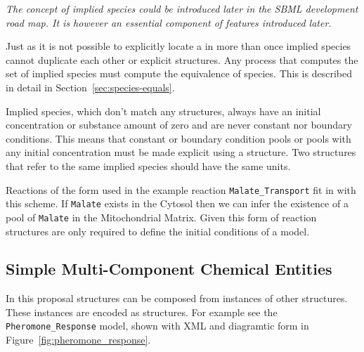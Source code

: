 \documentclass{cekarticle}
\begin{document}
\emph{The concept of implied species could be introduced later in the SBML development road map.
It is however an essential component of features introduced later.}

Just as it is not possible to explicitly locate a  in  more than
once implied species cannot duplicate each other or explicit  structures.
Any process that computes the set of implied species must compute the equivalence of
species.  This is described in detail in Section~\ref{sec:species-equals}.

Implied species, which don't match any  structures, always have an initial
concentration or substance amount of zero and are never
constant nor boundary conditions.  This means that constant or boundary condition pools or pools
with any initial concentration must be made explicit using a  structure.
Two
 structures that refer to the same implied species should have
the same units.

Reactions of the form used in the example reaction \texttt{Malate\_Transport} fit in with this scheme.
If \texttt{Malate} exists in the
Cytosol then we can infer the existence of a pool of \texttt{Malate} in the
Mitochondrial Matrix.  Given this form of reaction  structures are only
required to define the initial conditions of a model.

\subsection{Simple Multi-Component Chemical Entities}
\label{sec:multicomponentspecies}

In this proposal  structures can be composed from instances of other
 structures.
These instances are encoded as  structures.
For example see the \texttt{Pheromone\_Response} model, shown with XML and diagramtic form in
Figure~\ref{fig:pheromone_response}.
\end{document}
